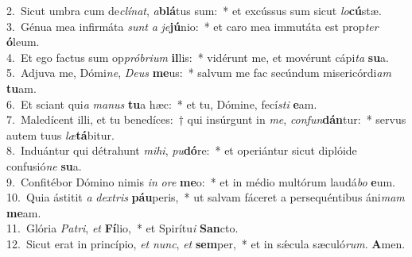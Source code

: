 {2.~}Sicut umbra cum de\textit{clí}\textit{nat}, \textit{a}\textbf{blá}tus sum:~* et excússus sum sicut \textit{lo}\textbf{cú}stæ.\\
{3.~}Génua mea infirmáta \textit{sunt} \textit{a} \textit{je}\textbf{jú}nio:~* et caro mea immutáta est prop\textit{ter} \textbf{ó}leum.\\
{4.~}Et ego factus sum op\textit{pró}\textit{bri}\textit{um} \textbf{il}lis:~* vidérunt me, et movérunt cápi\textit{ta} \textbf{su}a.\\
{5.~}Adjuva me, Dómi\textit{ne}, \textit{De}\textit{us} \textbf{me}us:~* salvum me fac secúndum misericórdi\textit{am} \textbf{tu}am.\\
{6.~}Et sciant qui\textit{a} \textit{ma}\textit{nus} \textbf{tu}a hæc:~* et tu, Dómine, fecí\textit{sti} \textbf{e}am.\\
{7.~}Maledícent illi, et tu benedíces:~† qui insúrgunt in \textit{me}, \textit{con}\textit{fun}\textbf{dán}tur:~* servus autem tuus \textit{læ}\textbf{tá}bitur.\\
{8.~}Induántur qui détrahunt \textit{mi}\textit{hi}, \textit{pu}\textbf{dó}re:~* et operiántur sicut diplóide confusió\textit{ne} \textbf{su}a.\\
{9.~}Confitébor Dómino nimis \textit{in} \textit{o}\textit{re} \textbf{me}o:~* et in médio multórum laudá\textit{bo} \textbf{e}um.\\
{10.~}Quia ástitit \textit{a} \textit{dex}\textit{tris} \textbf{páu}peris,~* ut salvam fáceret a persequéntibus áni\textit{mam} \textbf{me}am.\\
{11.~}Glória \textit{Pa}\textit{tri}, \textit{et} \textbf{Fí}lio,~* et Spirítu\textit{i} \textbf{San}cto.\\
{12.~}Sicut erat in princípio, \textit{et} \textit{nunc}, \textit{et} \textbf{sem}per,~* et in sǽcula sæculó\textit{rum}. \textbf{A}men.\\
